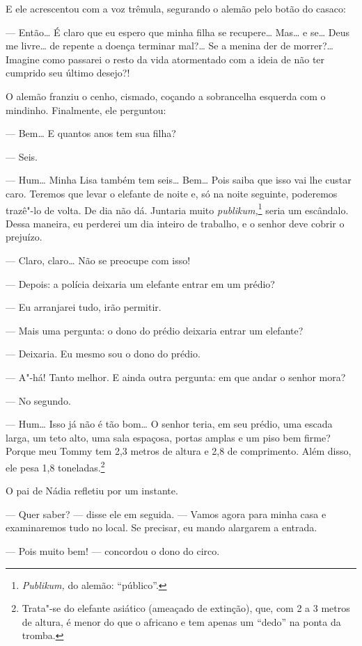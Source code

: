 E ele acrescentou com a voz trêmula, segurando o alemão pelo botão do
casaco:

--- Então\ldots{} É claro que eu espero que minha filha se recupere\ldots{}
Mas\ldots{} e se\ldots{} Deus me livre\ldots{} de repente a doença terminar mal?\ldots{} Se
a menina der de morrer?\ldots{} Imagine como passarei o resto da vida
atormentado com a ideia de não ter cumprido seu último desejo?!

O alemão franziu o cenho, cismado, coçando a sobrancelha esquerda com o
mindinho. Finalmente, ele perguntou:

--- Bem\ldots{} E quantos anos tem sua filha?

--- Seis.

--- Hum\ldots{} Minha Lisa também tem seis\ldots{} Bem\ldots{} Pois saiba que isso vai
lhe custar caro. Teremos que levar o elefante de noite e, só na noite
seguinte, poderemos trazê"-lo de volta. De dia não dá. Juntaria muito
\emph{publikum,}\footnote{\emph{Publikum,} do alemão: ``público''.}
seria um escândalo. Dessa maneira, eu perderei um dia inteiro de
trabalho, e o senhor deve cobrir o prejuízo.

--- Claro, claro\ldots{} Não se preocupe com isso!

--- Depois: a polícia deixaria um elefante entrar em um prédio?

--- Eu arranjarei tudo, irão permitir.

--- Mais uma pergunta: o dono do prédio deixaria entrar um elefante?

--- Deixaria. Eu mesmo sou o dono do prédio.

--- A"-há! Tanto melhor. E ainda outra pergunta: em que andar o senhor
mora?

--- No segundo.

--- Hum\ldots{} Isso já não é tão bom\ldots{} O senhor teria, em seu prédio, uma
escada larga, um teto alto, uma sala espaçosa, portas amplas e um piso
bem firme? Porque meu Tommy tem 2,3 metros de altura e 2,8 de
comprimento. Além disso, ele pesa 1,8 toneladas.\footnote{Trata"-se
  do elefante asiático (ameaçado de extinção), que, com 2 a 3 metros de
  altura, é menor do que o africano e tem apenas um ``dedo'' na
  ponta da tromba.}

O pai de Nádia refletiu por um instante.

--- Quer saber? --- disse ele em seguida. --- Vamos agora para minha
casa e examinaremos tudo no local. Se precisar, eu mando alargarem a
entrada.

--- Pois muito bem! --- concordou o dono do circo.

